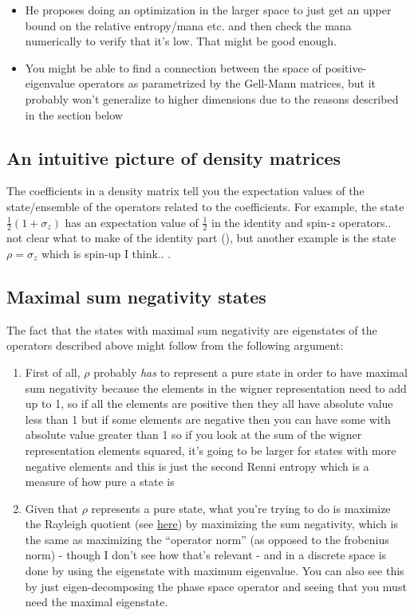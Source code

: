 \documentclass{report}
\begin{document}
\begin{enumerate}
\begin{itemize}
 	\item He proposes doing an optimization in the larger space to just get an upper bound on the relative entropy/mana etc. and then check the mana numerically to verify that it's low. That might be good enough. 
 	\item  You might be able to find a connection between the space of positive-eigenvalue operators as parametrized by the Gell-Mann matrices, but it probably won't generalize to higher dimensions due to the reasons described in the section below
 	\end{itemize}
 \end{enumerate}
 
 \subsection{An intuitive picture of density matrices}
 
 The coefficients in a density matrix tell you the expectation values of the state/ensemble of the operators related to the coefficients. For example, the state $\frac{1}{2}(1+\sigma_z)$ has an expectation value of $\frac{1}{2}$ in the identity and spin-$z$ operators.. not clear what to make of the identity part (\todo), but another example is the state $\rho=\sigma_z$ which is spin-up I think.. \todo.
 
 
 
 \subsection{Maximal sum negativity states}
 
 The fact that the states with maximal sum negativity are eigenstates of the operators described above might follow from the following argument:
 \begin{enumerate}
 \item First of all, $\rho$ probably \textit{has} to represent a pure state in order to have maximal sum negativity because the elements in the wigner representation need to add up to 1, so if all the elements are positive then they all have absolute value less than 1 but if some elements are negative then you can have some with absolute value greater than 1 so if you look at the sum of the wigner representation elements squared, it's going to be larger for states with more negative elements and this is just the second Renni entropy which is a measure of how pure a state is
 \item Given that $\rho$ represents a pure state, what you're trying to do is maximize the Rayleigh quotient (see \href{https://en.wikipedia.org/wiki/Rayleigh_quotient}{here}) by maximizing the sum negativity, which is the same as maximizing the ``operator norm'' (as opposed to the frobenius norm) - though I don't see how that's relevant - and in a discrete space is done by using the eigenstate with maximum eigenvalue. You can also see this by just eigen-decomposing the phase space operator and seeing that you must need the maximal eigenstate. 
 \end{enumerate}
 
\end{document}

